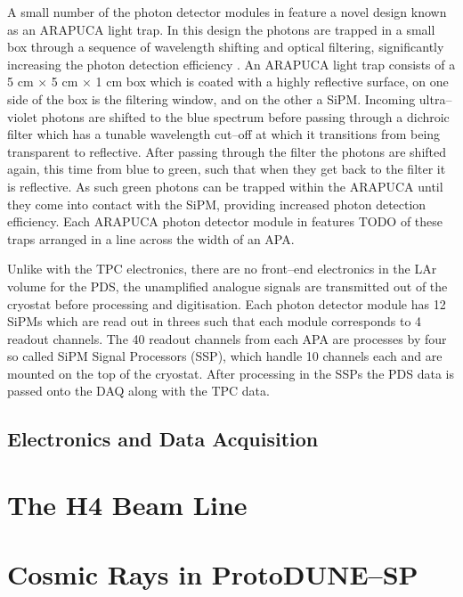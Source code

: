 A small number of the photon detector modules in \protodune{} feature a novel 
design known as an ARAPUCA light trap. In this design the photons are trapped 
in a small box through a sequence of wavelength shifting and optical 
filtering, significantly increasing the photon detection efficiency 
\cite{Segreto:2018jdx}. An ARAPUCA light trap consists of a 5 cm $\times$ 5 cm 
$\times$ 1 cm box which is coated with a highly reflective surface, on one 
side of the box is the filtering window, and on the other a SiPM. Incoming 
ultra--violet photons are shifted to the blue spectrum before passing through 
a dichroic filter which has a tunable wavelength cut--off at which it 
transitions from being transparent to reflective. After passing through the 
filter the photons are shifted again, this time from blue to green, such that 
when they get back to the filter it is reflective. As such green photons can 
be trapped within the ARAPUCA until they come into contact with the SiPM, 
providing increased photon detection efficiency. Each ARAPUCA photon detector 
module in \protodune{} features TODO of these traps arranged in a line across 
the width of an APA.

Unlike with the TPC electronics, there are no front--end electronics in the LAr
volume for the PDS, the unamplified analogue signals are transmitted out of the
cryostat before processing and digitisation. Each photon detector module has 
12 SiPMs which are read out in threes such that each module corresponds to 4 
readout channels. The 40 readout channels from each APA are processes by four 
so called SiPM Signal Processors (SSP), which handle 10 channels each and are 
mounted on the top of the cryostat. After processing in the SSPs the PDS data is
passed onto the DAQ along with the TPC data.

\subsection{Electronics and Data Acquisition}

\section{The H4 Beam Line} \label{sec:h4}


\section{Cosmic Rays in ProtoDUNE--SP} \label{sec:pdsp_cosmic}
